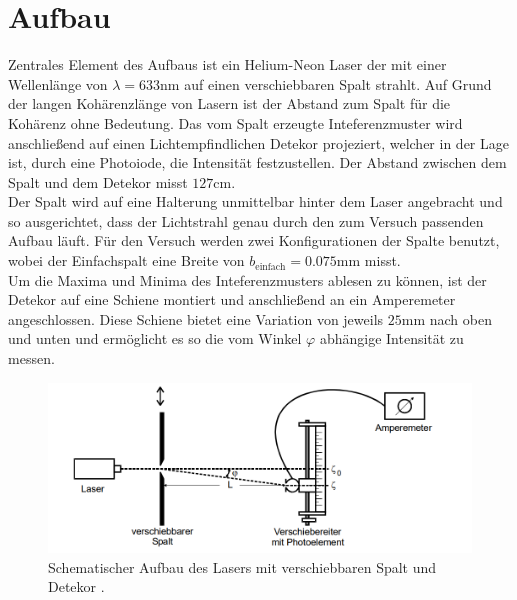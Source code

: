 \section{Aufbau}
Zentrales Element des Aufbaus ist ein Helium-Neon Laser der mit einer Wellenlänge von $\lambda = 633\si{\nano \meter}$ auf einen
verschiebbaren Spalt strahlt. Auf Grund der langen Kohärenzlänge von Lasern ist der Abstand zum Spalt für die Kohärenz ohne Bedeutung.
Das vom Spalt erzeugte Inteferenzmuster wird anschließend auf einen Lichtempfindlichen Detekor projeziert, 
welcher in der Lage ist, durch eine Photoiode, die Intensität festzustellen. Der Abstand zwischen dem Spalt und 
dem Detekor misst $127\si{\cm}$. 
\\
\newline
Der Spalt wird auf eine Halterung unmittelbar hinter dem Laser angebracht und so ausgerichtet, dass der Lichtstrahl 
genau durch den zum Versuch passenden Aufbau läuft. Für den Versuch werden zwei Konfigurationen der Spalte benutzt, wobei der 
Einfachspalt eine Breite von $b_{\text{einfach}}=0.075 \si{\mm}$ misst.
\\
\newline
Um die Maxima und Minima des Inteferenzmusters ablesen zu können, ist der Detekor auf eine Schiene montiert und anschließend an ein 
Amperemeter angeschlossen. 
Diese Schiene bietet eine Variation von jeweils $25 \si{\mm}$ nach oben und unten und ermöglicht es so die vom Winkel
$\varphi$ abhängige Intensität zu messen.
\begin{figure}
    \centering
    \includegraphics[width=\textwidth]{bilder/aufbau.png}
    \caption{Schematischer Aufbau des Lasers mit verschiebbaren Spalt und Detekor \cite{skript}.} 
    \label{fig:abb1}
\end{figure}
